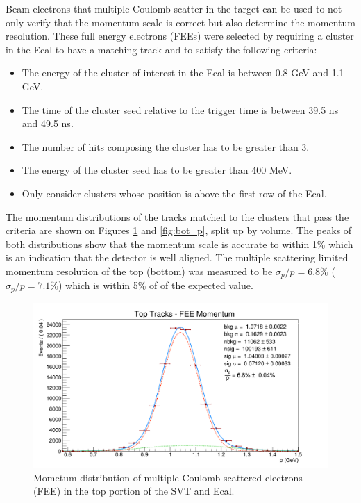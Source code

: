 Beam electrons that multiple Coulomb scatter in the target can be used to 
not only verify that the momentum scale is correct but also determine the 
momentum resolution.  These full energy electrons (FEEs) 
were selected by requiring a cluster in the Ecal to have a matching track and
to satisfy the following criteria:
\begin{itemize}
    \item The energy of the cluster of interest in the Ecal  is between 0.8 GeV
          and 1.1 GeV.
    \item The time of the cluster seed relative to the trigger time is between
          39.5 ns and 49.5 ns.
    \item The number of hits composing the cluster has to be greater than 3.
    \item The energy of the cluster seed has to be greater than 400 MeV.
    \item Only consider clusters whose position is above the first row of the 
          Ecal.
\end{itemize}
The momentum distributions of the tracks matched to the clusters that pass the
criteria are shown on Figures \ref{fig:top_p} and \ref{fig:bot_p}, split up by volume.  The peaks
of both distributions show that the momentum scale is accurate to within 1\% 
which is an indication that the detector is well aligned.  The 
multiple scattering limited momentum resolution of the top (bottom) was measured
to be $\sigma_{p}/p = 6.8\%$ ($\sigma_{p}/p = 7.1\%$) which 
is within 5\% of of the expected value.
\begin{figure}[h!t]
    \centering
    \includegraphics[width=.95\textwidth]{images/20160424_fee_top_tracks_p.png}
    \caption{Mometum distribution of multiple Coulomb scattered electrons (FEE) in
             the top portion of the SVT and Ecal.}
    \label{fig:top_p}
\end{figure}

